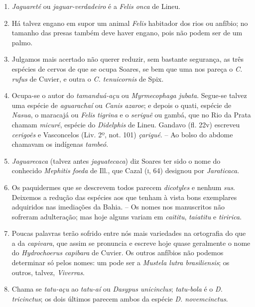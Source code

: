 \begin{enumerate}
\item \textit{Jaguareté} ou \textit{jaguar-verdadeiro} é a \textit{Felis onca} de Lineu.

\item Há talvez engano em supor um animal \textit{Felis} habitador dos rios ou anfíbio; no 
tamanho das presas também deve haver engano, pois não podem ser de um palmo.

\item Julgamos mais acertado não querer reduzir, sem bastante segurança, as três 
espécies de cervos de que se ocupa Soares, se bem que uma nos pareça o \textit{C. rufus} de 
Cuvier, e outra o \textit{C. tenuicornis} de Spix.

\item Ocupa-se o autor do \textit{tamanduá-açu} ou \textit{Myrmecophaga jubata}. Segue-se talvez 
uma espécie de \textit{aguarachaí} ou \textit{Canis azaroe}; e depois o quati, espécie de \textit{Nasua}, o 
maracajá ou \textit{Felis tigrina} e o \textit{seriguê} ou gambá, que no Rio da Prata chamam \textit{micuré}, 
espécie do \textit{Didelphis} de Lineu. Gandavo (fl. 22v) escreveu \textit{cerigoês} e Vasconcelos (Liv. 
2º, not. 101) \textit{çarigué}. -- Ao bolso do abdome chamavam os indígenas \textit{tambeó}.

\item \textit{Jaguarecaca} (talvez antes \textit{jaguatecaca}) diz Soares ter sido o nome do conhecido  
\textit{Mephitis foeda} de Ill., que Cazal (\textsc{i}, 64) designou por \textit{Jaraticaca}.

\item Os paquidermes que se descrevem todos parecem \textit{dicotyles} e nenhum \textit{sus}. 
Deixemos a redução das espécies aos que tenham à vista bons exemplares adquiridos 
nas imediações da Bahia. -- Os nomes nos manuscritos não sofreram adulteração; mas 
hoje alguns variam em \textit{caititu}, \textit{taiatitu} e \textit{tiririca}.

\item Poucas palavras terão sofrido entre nós mais variedades na ortografia do que a da 
\textit{capivara}, que assim se pronuncia e escreve hoje quase geralmente o nome do  \textit{Hydrochoerus capibara} de Cuvier.
Os outros anfíbios não podemos determinar só pelos nomes: um pode ser a \textit{Mustela lutra brasiliensis}; os outros, 
talvez, \textit{Viverras}.

\item Chama se \textit{tatu-açu} ao \textit{tatu-aí} ou \textit{Dasypus unicinclus}; \textit{tatu-bola} é o \textit{D. tricinctus}; 
os dois últimos parecem ambos da espécie \textit{D. novemcinctus}.


\end{enumerate}
